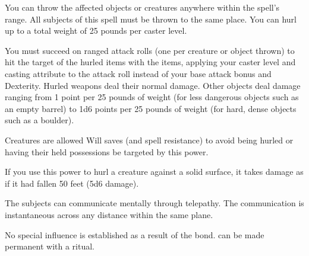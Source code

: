 \spellrng{\rngmed}
\begin{spelleffect}
  You can throw the affected objects or creatures anywhere within the spell's range. All subjects of this spell must be thrown to the same place. You can hurl up to a total weight of 25 pounds per caster level.
  \par You must succeed on ranged attack rolls (one per creature or object thrown) to hit the target of the hurled items with the items, applying your caster level and casting attribute to the attack roll instead of your base attack bonus and Dexterity. Hurled weapons deal their normal damage. Other objects deal damage ranging from 1 point per 25 pounds of weight (for less dangerous objects such as an empty barrel) to 1d6 points per 25 pounds of weight (for hard, dense objects such as a boulder).
  \par Creatures are allowed Will saves (and spell resistance) to avoid being hurled or having their held possessions be targeted by this power.
  \par If you use this power to hurl a creature against a solid surface, it takes damage as if it had fallen 50 feet (5d6 damage).
\end{spelleffect}

\spellrng{\rngclose}
\begin{spelleffect}
  The subjects can communicate mentally through telepathy. The communication is instantaneous across any distance within the same plane.
\end{spelleffect}
\begin{spellnotes}
  No special influence is established as a result of the bond.  can be made permanent with a  ritual.
\end{spellnotes}

